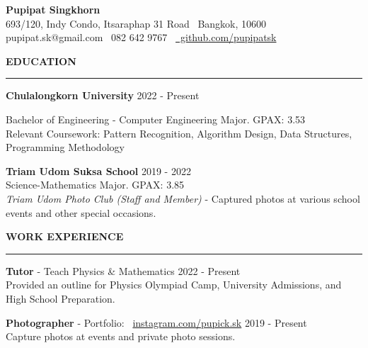 \documentclass[11pt]{article}
\begin{document}
\begin{center}
    {\Large \textbf{Pupipat Singkhorn}}\\
    693/120, Indy Condo, Itsaraphap 31 Road \textbullet \ Bangkok, 10600 \\
    pupipat.sk@gmail.com \textbullet \ 082 642 9767 \textbullet\ \href{https://github.com/pupipatsk}{\faGithub\ github.com/pupipatsk}
\end{center}
\textbf{EDUCATION}
\vspace{5pt}
{\color{NavyBlue}\hrule}
\vspace{9pt}
\textbf{Chulalongkorn University} \hfill 2022 - Present

\hspace*{7pt} Bachelor of Engineering - Computer Engineering Major. GPAX: 3.53\\
\hspace*{7pt} Relevant Coursework: Pattern Recognition, Algorithm Design, Data Structures, Programming Methodology

\vspace{6pt}

\textbf{Triam Udom Suksa School} \hfill 2019 - 2022\\
\hspace*{7pt} Science-Mathematics Major. GPAX: 3.85\\
\hspace*{7pt} \textit{Triam Udom Photo Club (Staff and Member)} - Captured photos at various school events and other special occasions.

\vspace{12pt}
\textbf{WORK EXPERIENCE}
\vspace{5pt}
{\color{NavyBlue}\hrule}
\vspace{9pt}
\textbf{Tutor} - Teach Physics \& Mathematics \hfill 2022 - Present\\
\hspace*{7pt} Provided an outline for Physics Olympiad Camp, University Admissions, and High School Preparation.

\vspace{6pt}

\textbf{Photographer} - Portfolio: \faInstagram\ \href{https://www.instagram.com/pupick.sk}{instagram.com/pupick.sk} \hfill 2019 - Present\\
\hspace*{7pt} Capture photos at events and private photo sessions.
\end{document}
